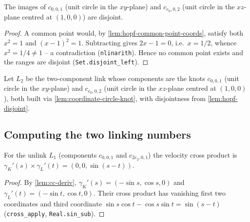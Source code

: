 \begin{lemma}
    \label{lem:hopf-disjoint}
    The images of $c_{0,0,1}$ (unit circle in the $xy$-plane) and $c_{e_0,0,2}$
    (unit circle in the $xz$-plane centred at $(1,0,0)$) are disjoint.
\end{lemma}
\begin{proof}
    A common point would, by \cref{lem:hopf-common-point-coords}, satisfy both
    $x^2 = 1$ and $(x-1)^2 = 1$. Subtracting gives $2x - 1 = 0$, i.e.\ $x = 1/2$,
    whence $x^2 = 1/4 \neq 1$ -- a contradiction (\texttt{nlinarith}). Hence no
    common point exists and the ranges are disjoint (\texttt{Set.disjoint\_left}).
\end{proof}

\begin{definition}
    \label{def:hopf-link}
    Let $L_2$ be the two-component link whose components are the knots $c_{0,0,1}$
    (unit circle in the $xy$-plane) and $c_{e_0,0,2}$ (unit circle in the
    $xz$-plane centred at $(1,0,0)$), both built via
    \cref{lem:coordinate-circle-knot}, with disjointness from
    \cref{lem:hopf-disjoint}.
\end{definition}

\subsection{Computing the two linking numbers}

\begin{lemma}
    \label{lem:unlink-crossproduct}
    For the unlink $L_1$ (components $c_{0,0,1}$ and $c_{2e_2,0,1}$) the velocity
    cross product is $\gamma_K'(s)\times\gamma_L'(t) = (0,0,\sin(s-t))$.
\end{lemma}
\begin{proof}
    By \cref{lem:cc-deriv}, $\gamma_K'(s) = (-\sin s,\cos s,0)$ and
    $\gamma_L'(t) = (-\sin t,\cos t,0)$. Their cross product has vanishing first two
    coordinates and third coordinate $\sin s\cos t-\cos s\sin t = \sin(s-t)$
    (\texttt{cross\_apply}, \texttt{Real.sin\_sub}).
\end{proof}

